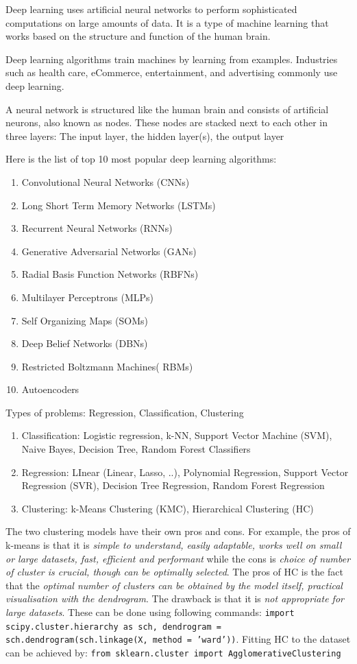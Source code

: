 \documentclass[11pt]{article}
\begin{document}
Deep learning uses artificial neural networks to perform sophisticated computations on large amounts of data. It is a type of machine learning that works based on the structure and function of the human brain. 

Deep learning algorithms train machines by learning from examples. Industries such as health care, eCommerce, entertainment, and advertising commonly use deep learning.


A neural network is structured like the human brain and consists of artificial neurons, also known as nodes. These nodes are stacked next to each other in three layers:
The input layer, the hidden layer(s), the output layer



Here is the list of top 10 most popular deep learning algorithms:
\begin{enumerate}
\item Convolutional Neural Networks (CNNs)
\item Long Short Term Memory Networks (LSTMs)
\item Recurrent Neural Networks (RNNs)
\item Generative Adversarial Networks (GANs)
\item Radial Basis Function Networks (RBFNs)
\item Multilayer Perceptrons (MLPs)
\item Self Organizing Maps (SOMs)
\item Deep Belief Networks (DBNs)
\item Restricted Boltzmann Machines( RBMs)
\item Autoencoders
\end{enumerate} 




Types of problems: Regression, Classification, Clustering 

\begin{enumerate}
\item Classification: Logistic regression, k-NN, Support Vector Machine (SVM), Naive Bayes, Decision Tree, Random Forest Classifiers
\item Regression: LInear (Linear, Lasso, ..), Polynomial Regression, Support Vector Regression (SVR), Decision Tree Regression, Random Forest Regression
\item Clustering: k-Means Clustering (KMC), Hierarchical Clustering (HC)
\end{enumerate}

The two clustering models have their own pros and cons. For example, the pros of k-means is that it is \emph{simple to understand, easily adaptable, works well on small or large datasets, fast, efficient and performant}
while the cons is \emph{choice of number of cluster is crucial, though can be optimally selected}.
The pros of HC is the fact that the \emph{optimal number of clusters can be obtained by the 
model itself, practical visualisation with the dendrogram}. The drawback is that it is \emph{not appropriate for large datasets}. 
These can be done using following commands: \texttt{import scipy.cluster.hierarchy as sch, dendrogram = sch.dendrogram(sch.linkage(X, method = 'ward'))}. 
Fitting HC to the dataset can be achieved by: \texttt{from sklearn.cluster import AgglomerativeClustering}
\end{document}

